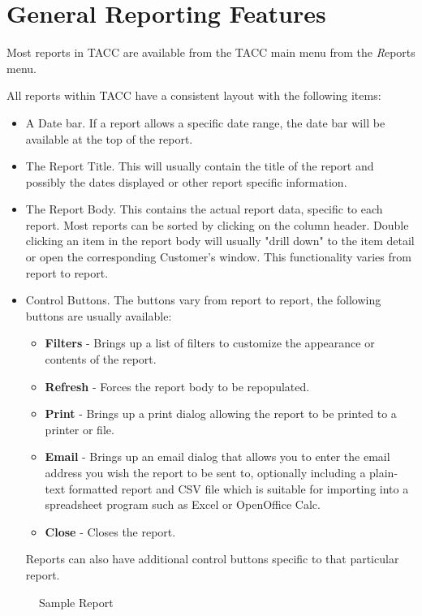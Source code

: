 \section{General Reporting Features}

Most reports in TACC are available from the TACC main menu from the
{\emph Reports} menu.

All reports within TACC have a consistent layout with the following items:
\begin{itemize}
\item A Date bar.  If a report allows a specific date range, the date
bar will be available at the top of the report.
\item The Report Title.  This will usually contain the title of the
report and possibly the dates displayed or other report specific
information.
\item The Report Body.  This contains the actual report data, specific
to each report.  Most reports can be sorted by clicking on the column
header.  Double clicking an item in the report body will usually "drill
down" to the item detail or open the corresponding Customer's window.
This functionality varies from report to report.
\item Control Buttons.  The buttons vary from report to report, the
following buttons are usually available:
\begin{itemize}
\item {\bf Filters} - Brings up a list of filters to customize the
appearance or contents of the report.
\item {\bf Refresh} - Forces the report body to be repopulated.
\item {\bf Print} - Brings up a print dialog allowing the report to be
printed to a printer or file.
\item {\bf Email} - Brings up an email dialog that allows you to enter
the email address you wish the report to be sent to, optionally
including a plain-text formatted report and CSV file which is suitable
for importing into a spreadsheet program such as Excel or OpenOffice
Calc.
\item {\bf Close} - Closes the report.
\end{itemize}
Reports can also have additional control buttons specific to that
particular report.
\end{itemize}


\begin{figure}[hbtp]
\caption{ \label{fig:SampleReport} Sample Report }
\end{figure}

